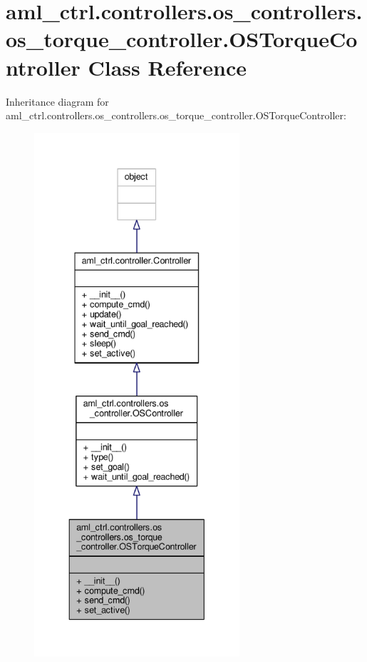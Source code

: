 \hypertarget{classaml__ctrl_1_1controllers_1_1os__controllers_1_1os__torque__controller_1_1_o_s_torque_controller}{\section{aml\-\_\-ctrl.\-controllers.\-os\-\_\-controllers.\-os\-\_\-torque\-\_\-controller.\-O\-S\-Torque\-Controller Class Reference}
\label{classaml__ctrl_1_1controllers_1_1os__controllers_1_1os__torque__controller_1_1_o_s_torque_controller}
}


Inheritance diagram for aml\-\_\-ctrl.\-controllers.\-os\-\_\-controllers.\-os\-\_\-torque\-\_\-controller.\-O\-S\-Torque\-Controller\-:
\nopagebreak
\begin{figure}[H]
\begin{center}
\leavevmode
\includegraphics[height=550pt]{classaml__ctrl_1_1controllers_1_1os__controllers_1_1os__torque__controller_1_1_o_s_torque_controller__inherit__graph}
\end{center}
\end{figure}



